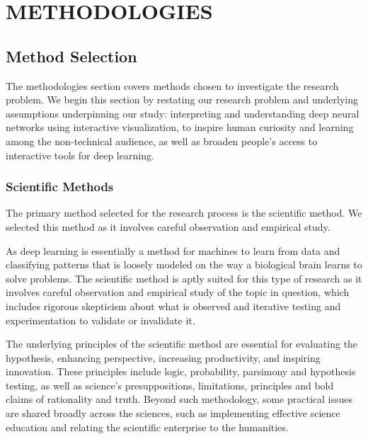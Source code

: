 \chapter{METHODOLOGIES}

\graphicspath{ {./methodologies/} }
\thispagestyle{empty}


\section{Method Selection}

The methodologies section covers methods chosen to investigate the research problem. We begin this section by restating our research problem and underlying assumptions underpinning our study: interpreting and understanding deep neural networks using interactive visualization, to inspire human curiosity and learning among the non-technical audience, as well as broaden people's access to interactive tools for deep learning.

\subsection{Scientific Methods}

The primary method selected for the research process is the scientific method. We selected this method as it involves careful observation and empirical study.

As deep learning is essentially a method for machines to learn from data and classifying patterns that is loosely modeled on the way a biological brain learns to solve problems. The scientific method is aptly suited for this type of research as it involves careful observation and empirical study of the topic in question, which includes rigorous skepticism about what is observed and iterative testing and experimentation to validate or invalidate it.

The underlying principles of the scientific method \cite{gauch} are essential for evaluating the hypothesis, enhancing perspective, increasing productivity, and inspiring innovation. These principles include logic, probability, parsimony and hypothesis testing, as well as science's presuppositions, limitations, principles and bold claims of rationality and truth. Beyond such methodology, some practical issues are shared broadly across the sciences, such as implementing effective science education and relating the scientific enterprise to the humanities.

